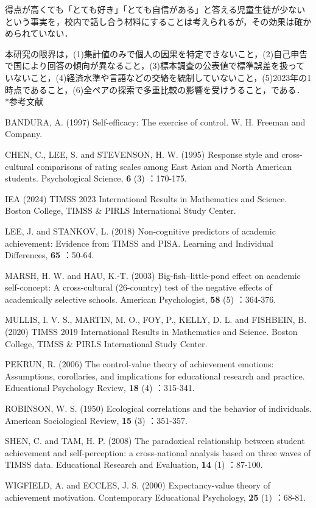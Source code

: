 \documentclass[a4paper,10pt,twocolumn]{ltjsarticle}
\makeatletter
\renewcommand{\section}{\@startsection{section}{1}{\z@}{1.1\Cvs \@plus.4\Cdp \@minus.2\Cdp}{.5\Cvs \@plus.2\Cdp}{\normalfont\gtfamily\bfseries\large}}
\makeatother
\begin{document}
得点が高くても「とても好き」「とても自信がある」と答える児童生徒が少ないという事実を，校内で話し合う材料にすることは考えられるが，その効果は確かめられていない．

本研究の限界は，(1)集計値のみで個人の因果を特定できないこと，(2)自己申告で国により回答の傾向が異なること，(3)標本調査の公表値で標準誤差を扱っていないこと，(4)経済水準や言語などの交絡を統制していないこと，(5)2023年の1時点であること，(6)全ペアの探索で多重比較の影響を受けうること，である．
\section*{参考文献}
\begingroup\scriptsize\raggedright{} 
\begin{list}{}{\setlength{\leftmargin}{1.5\zw}\setlength{\itemindent}{-1.5\zw}\setlength{\labelwidth}{0pt}\setlength{\labelsep}{0pt}\setlength{\itemsep}{1pt}\setlength{\parsep}{0pt}\setlength{\topsep}{0pt}\setlength{\listparindent}{0pt}}
\item BANDURA, A. (1997) Self-efficacy: The exercise of control. W. H. Freeman and Company.
\item CHEN, C., LEE, S. and STEVENSON, H. W. (1995) Response style and cross-cultural comparisons of rating scales among East Asian and North American students. Psychological Science, \textbf{6} (3) ：170-175.
\item IEA (2024) TIMSS 2023 International Results in Mathematics and Science. Boston College, TIMSS \& PIRLS International Study Center.
\item LEE, J. and STANKOV, L. (2018) Non-cognitive predictors of academic achievement: Evidence from TIMSS and PISA. Learning and Individual Differences, \textbf{65} ：50-64.
\item MARSH, H. W. and HAU, K.-T. (2003) Big-fish--little-pond effect on academic self-concept: A cross-cultural (26-country) test of the negative effects of academically selective schools. American Psychologist, \textbf{58} (5) ：364-376.
\item MULLIS, I. V. S., MARTIN, M. O., FOY, P., KELLY, D. L. and FISHBEIN, B. (2020) TIMSS 2019 International Results in Mathematics and Science. Boston College, TIMSS \& PIRLS International Study Center.
\item PEKRUN, R. (2006) The control-value theory of achievement emotions: Assumptions, corollaries, and implications for educational research and practice. Educational Psychology Review, \textbf{18} (4) ：315-341.
\item ROBINSON, W. S. (1950) Ecological correlations and the behavior of individuals. American Sociological Review, \textbf{15} (3) ：351-357.
\item SHEN, C. and TAM, H. P. (2008) The paradoxical relationship between student achievement and self-perception: a cross-national analysis based on three waves of TIMSS data. Educational Research and Evaluation, \textbf{14} (1) ：87-100.
\item WIGFIELD, A. and ECCLES, J. S. (2000) Expectancy-value theory of achievement motivation. Contemporary Educational Psychology, \textbf{25} (1) ：68-81.
\end{list}\endgroup
\end{document}
